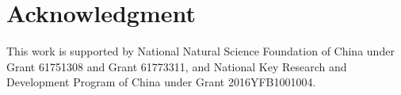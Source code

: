 \documentclass[journal]{IEEEtran}
\begin{document}
\section*{Acknowledgment}
This work is supported by National Natural Science Foundation of China under Grant 61751308 and Grant 61773311, and National Key Research and Development Program of China under Grant 2016YFB1001004.



















\ifCLASSOPTIONcaptionsoff
  \newpage
\fi
\end{document}
